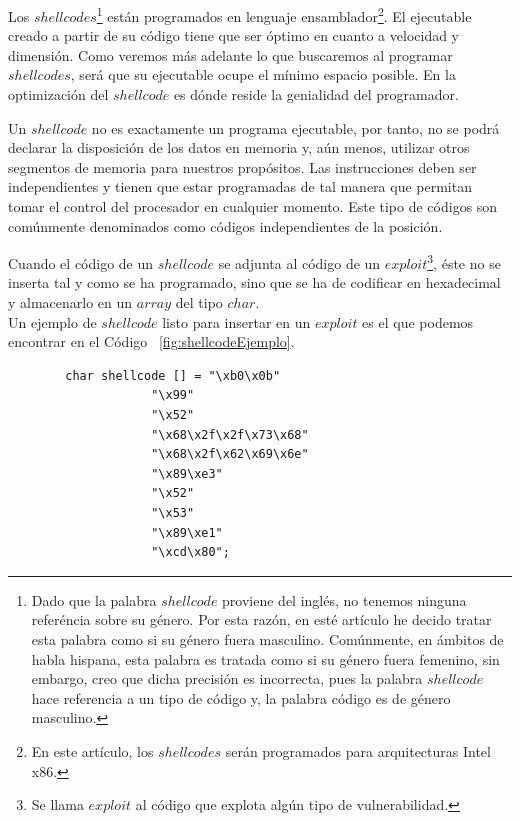 \documentclass [titlepage, 12pt]{article}
\begin{document}
Los $shellcodes$\footnote{Dado que la palabra $shellcode$ proviene del ingl\'es, no tenemos ninguna refer\'encia sobre su g\'enero. Por esta raz\'on, en est\'e art\'iculo he decido tratar esta palabra como si su g\'enero fuera masculino. Com\'unmente, en \'ambitos de habla hispana, esta palabra es tratada como si su g\'enero fuera femenino, sin embargo, creo que dicha precisi\'on es incorrecta, pues la palabra $shellcode$ hace referencia a un tipo de c\'odigo y, la palabra c\'odigo es de g\'enero masculino.} est\'an programados en lenguaje ensamblador\footnote {En este art\'iculo, los $shellcodes$ ser\'an programados para arquitecturas Intel x86.}. El ejecutable creado a partir de su c\'odigo tiene que ser \'optimo en cuanto a velocidad y dimensi\'on. Como veremos m\'as adelante lo que buscaremos al programar $shellcodes$, ser\'a que su ejecutable ocupe el m\'inimo espacio posible. En la optimizaci\'on del $shellcode$ es d\'onde reside la genialidad del programador. \bigskip

Un $shellcode$ no es exactamente un programa ejecutable, por tanto, no se podr\'a declarar la disposici\'on de los datos en memoria y, a\'un menos, utilizar otros segmentos de memoria para nues\-tros prop\'ositos. Las instrucciones deben ser independientes y tienen que estar programadas de tal manera que permitan tomar el control del procesador en cualquier momento. Este tipo de c\'odigos son com\'unmente denominados como c\'odigos independientes de la posici\'on. \bigskip

Cuando el c\'odigo de un $shellcode$ se adjunta al c\'odigo de un $exploit$\footnote {Se llama $exploit$ al c\'odigo que explota alg\'un tipo de vulnerabilidad.}, \'este no se inserta tal y como se ha programado, sino que se ha de codificar en hexadecimal y almacenarlo en un $array$ del tipo $char$.\\
Un ejemplo de $shellcode$ listo para insertar en un $exploit$ es el que podemos encontrar en el C\'odigo ~\ref{fig:shellcodeEjemplo}.\bigskip
\lstset{language=C++,caption=$Shellcode$ en hexadecimal de ejemplo,label=fig:shellcodeEjemplo}
\begin{lstlisting}
		char shellcode [] = "\xb0\x0b"
                    "\x99"
                    "\x52"
                    "\x68\x2f\x2f\x73\x68"
                    "\x68\x2f\x62\x69\x6e"
                    "\x89\xe3"
                    "\x52"
                    "\x53"
                    "\x89\xe1"
                    "\xcd\x80";
\end{lstlisting}
\end{document}
